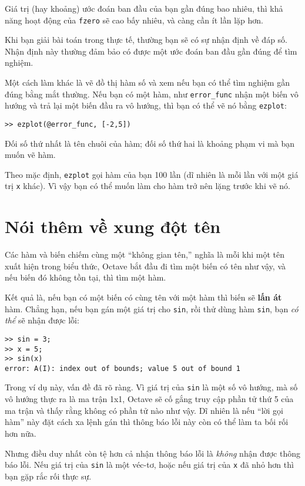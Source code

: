\documentclass[12pt]{book}
\begin{document}
Giá trị (hay khoảng) ước đoán ban đầu của bạn gần đúng bao nhiêu, thì
khả năng hoạt động của {\tt fzero} sẽ cao bấy nhiêu, và càng cần ít
lần lặp hơn.

Khi bạn giải bài toán trong thực tế, thường bạn sẽ có sự nhận định
về đáp số. Nhận định này thường đảm bảo có được một ước đoán
ban đầu gần đúng để tìm nghiệm.

Một cách làm khác là vẽ đồ thị hàm số và xem nếu bạn có thể
tìm nghiệm gần đúng bằng mắt thường. Nếu bạn có một hàm,
như \verb#error_func# nhận một biến vô hướng và trả lại một
biến đầu ra vô hướng, thì bạn có thể vẽ nó bằng {\tt ezplot}:

\begin{verbatim}
>> ezplot(@error_func, [-2,5])
\end{verbatim}

Đối số thứ nhất là tên chuôi của hàm; đối số thứ hai là khoảng
phạm vi mà bạn muốn vẽ hàm.

Theo mặc định, {\tt ezplot} gọi hàm của bạn 100 lần (dĩ nhiên là mỗi lần
với một giá trị {\tt x} khác). Vì vậy bạn có thể muốn làm cho hàm trở nên
lặng trước khi vẽ nó.


\section{Nói thêm về xung đột tên}

Các hàm và biến chiếm cùng một ``không gian tên,'' nghĩa là mỗi khi 
một tên xuất hiện trong biểu thức, Octave bắt đầu đi tìm một biến
có tên như vậy, và nếu biến đó không tồn tại, thì tìm một hàm.

Kết quả là, nếu bạn có một biến có cùng tên với một hàm thì biến sẽ 
{\bf lấn át} hàm. Chẳng hạn, nếu bạn gán một giá trị cho {\tt sin}, 
rồi thử dùng hàm {\tt sin}, bạn {\em có thể} sẽ nhận được lỗi:

\begin{verbatim}
>> sin = 3;
>> x = 5;
>> sin(x)
error: A(I): index out of bounds; value 5 out of bound 1
\end{verbatim}
%
Trong ví dụ này, vấn đề đã rõ ràng. Vì giá trị của {\tt sin} là
một số vô hướng, mà số vô hướng thực ra là ma trận 1x1, Octave sẽ
cố gắng truy cập phần tử thứ 5 của ma trận và thấy rằng không có
phần tử nào như vậy. Dĩ nhiên là nếu ``lời gọi hàm'' này đặt cách xa
lệnh gán thì thông báo lỗi này còn có thể làm ta bối rối hơn nữa.

Nhưng điều duy nhất còn tệ hơn cả nhận thông báo lỗi là {\em không}
nhận được thông báo lỗi. Nếu giá trị của {\tt sin} là một véc-tơ,
hoặc nếu giá trị của {\tt x} đã nhỏ hơn thì bạn gặp rắc rối thực sự.
\end{document}
